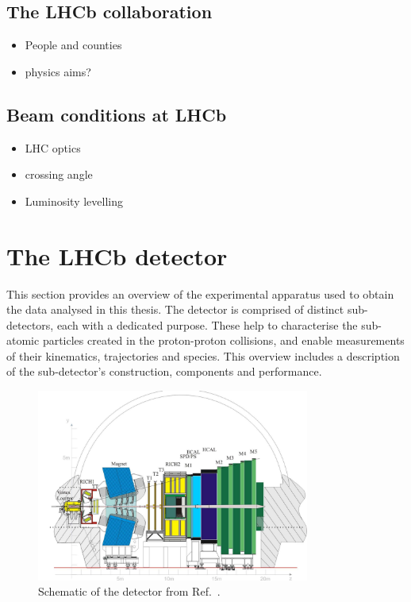 \subsection{The LHCb collaboration} 
{\color{Red}
\begin{itemize}
\item People and counties 
\item physics aims?
\end{itemize}
}
\subsection{Beam conditions at LHCb}
{\color{Red}
\begin{itemize}
\item LHC optics
\item crossing angle
\item Luminosity levelling
\end{itemize}
}


\section{The LHCb detector}

This section provides an overview of the experimental apparatus used to obtain the data analysed in this thesis.
The \lhcb detector is comprised of distinct sub-detectors, each with a dedicated purpose. These help to characterise the sub-atomic particles created in the proton-proton collisions, and enable measurements of their kinematics, trajectories and species.
This overview includes a description of the sub-detector's construction, components and performance. 



\begin{figure}[!h]
    \centering
    \includegraphics[width=0.8\textwidth]{figs/Detector/LHCb_Detector_Schematic.pdf}
    \caption{Schematic of the \lhcb detector from Ref.~\cite{Alves:2008zz}.}
    \label{fig:Dec_LHCb_Schematic}   
\end{figure}



